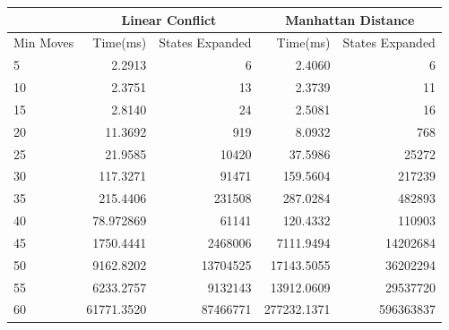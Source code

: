 \documentclass[progress]{cmpreport}
\begin{document}
\begin{center}

	\begin{tabular}{|l|r|r|r|r|} \cline{2-5}
		
		\multicolumn{1}{c}{} & \multicolumn{2}{|c|}{Linear Conflict} &
		\multicolumn{2}{|c|}{Manhattan Distance} \\ \hline
		Min Moves & Time(ms) & States Expanded & Time(ms) & States Expanded \\	\hline \hline
		5  & 2.2913 & 6                        & 2.4060       &          6            \\
		10 & 2.3751  & 13                      & 2.3739       &         11            \\
		15 & 2.8140 & 24                       & 2.5081          &      16            \\
		20 & 11.3692 & 919                     & 8.0932        &        768           \\
		25&  21.9585  & 10420                  & 37.5986        &       25272         \\
		30& 117.3271 & 91471                   & 159.5604        &      217239        \\
		35  & 215.4406 & 231508                & 287.0284        &      482893        \\
		40& 78.972869 & 61141                  & 120.4332          &    110903        \\
		45 & 1750.4441 & 2468006               & 7111.9494        &     14202684      \\
		50& 9162.8202 & 13704525               & 17143.5055         &   36202294       \\
		55 & 6233.2757 & 9132143               & 13912.0609        &    29537720       \\
		60 & 61771.3520 & 87466771             & 277232.1371      &     596363837      \\
		\hline
		
	\end{tabular}
	
\end{center}
\end{document}
